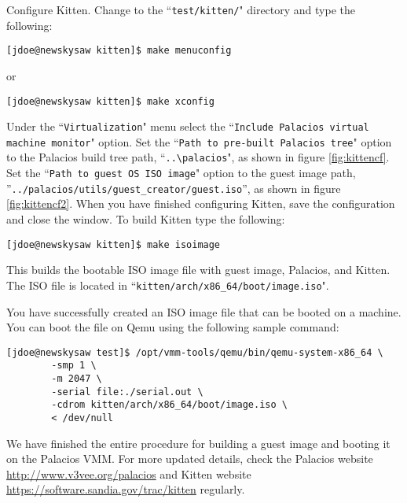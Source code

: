 \documentclass{article}[11pt]
\begin{document}
Configure Kitten. Change to the ``\verb+test/kitten/+" directory and type the
following:

\begin{verbatim}
[jdoe@newskysaw kitten]$ make menuconfig
\end{verbatim}

\noindent
or

\begin{verbatim}
[jdoe@newskysaw kitten]$ make xconfig
\end{verbatim}

\noindent
Under the ``\verb|Virtualization|" menu select the
``\verb|Include Palacios virtual machine monitor|" option. Set the
``\verb|Path to pre-built Palacios tree|" option to the Palacios build tree
path, ``\verb|..\palacios|", as shown in figure \ref{fig:kittencf}. Set the
``\verb|Path to guest OS ISO image|" option to the guest image path,\\
''\verb|../palacios/utils/guest_creator/guest.iso|'', as shown in figure
\ref{fig:kittencf2}.  When you have finished configuring Kitten, save the
configuration and close the window. To build Kitten type the following:

\begin{verbatim}
[jdoe@newskysaw kitten]$ make isoimage
\end{verbatim}

\noindent
This builds the bootable ISO image file with guest image, Palacios, and Kitten.
The ISO file is located in ``\verb+kitten/arch/x86_64/boot/image.iso+".

\pagebreak
\noindent
You have successfully created an ISO image file that can be booted on a machine.
You can boot the file on Qemu using the following sample command:

\begin{verbatim}
[jdoe@newskysaw test]$ /opt/vmm-tools/qemu/bin/qemu-system-x86_64 \
        -smp 1 \
        -m 2047 \
        -serial file:./serial.out \
        -cdrom kitten/arch/x86_64/boot/image.iso \
        < /dev/null
\end{verbatim}

\noindent
We have finished the entire procedure for building a guest image and booting it
on the Palacios VMM. For more updated details, check the Palacios website
\url{http://www.v3vee.org/palacios} and Kitten website
\url{https://software.sandia.gov/trac/kitten} regularly.
\end{document}
